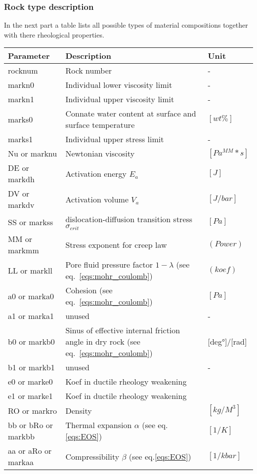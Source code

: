 \subsubsection{Rock type description}

In the next part a table lists all possible types of material compositions together with there rheological properties.

\begin{table}[H]
\small
\centering
\begin{tabular}{l p{8cm} l}
\toprule
Parameter & Description & Unit\\
\midrule
rocknum & Rock number & - \\ 
markn0 & Individual lower viscosity limit & - \\ 
markn1 & Individual upper viscosity limit & - \\ 
marks0 & Connate water content at surface and surface temperature & $[wt\%]$ \\ 
marks1 & Individual upper stress limit & - \\ 
Nu or marknu & Newtonian viscosity & $[Pa^{MM}*s]$ \\ 
DE or markdh & Activation energy $E_a$ & $[J]$\\ 
DV or markdv & Activation volume $V_a$ & $[J/bar]$ \\ 
SS or markss & dislocation-diffusion transition stress $\sigma_{crit}$ & $[Pa]$ \\ 
MM or markmm & Stress exponent for creep law & $(Power)$ \\ 
LL or markll & Pore fluid pressure factor $1-\lambda$ (see eq.~\ref{eqs:mohr_coulomb}) & $(koef)$ \\ 
a0 or marka0 & Cohesion (see eq.~\ref{eqs:mohr_coulomb}) & $[Pa]$ \\
a1 or marka1 & unused & - \\
b0 or markb0 & Sinus of effective internal friction angle in dry rock (see eq.~\ref{eqs:mohr_coulomb}) & [deg°]/[rad] \\
b1 or markb1 & unused & - \\
e0 or marke0 & Koef in ductile rheology weakening \todo{???} & \todo{???} \\
e1 or marke1 & Koef in ductile rheology weakening \todo{???} & \todo{???} \\ 
RO or markro & Density & $[kg/M^3]$ \\ 
bb or bRo or markbb & Thermal expansion $\alpha$ (see eq.\ref{eqs:EOS}) & $[1/K]$ \\ 
aa or aRo or markaa & Compressibility $\beta$ (see eq.\ref{eqs:EOS}) & $[1/kbar]$\\ 

\end{tabular}
\end{table}
